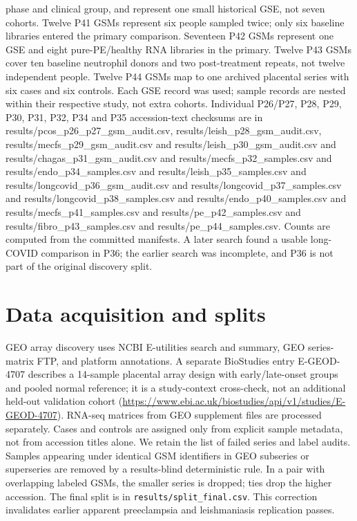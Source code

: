 \documentclass[11pt,a4paper]{article}
\begin{document}
phase and clinical group, and represent one small historical GSE, not seven cohorts. Twelve P41 GSMs represent six people sampled twice; only six baseline libraries entered the primary comparison. Seventeen P42 GSMs represent one GSE and eight pure-PE/healthy RNA libraries in the primary. Twelve P43 GSMs cover ten baseline neutrophil donors and two post-treatment repeats, not twelve independent people. Twelve P44 GSMs map to one archived placental series with six cases and six controls. Each GSE record was used; sample records are nested within their respective study, not extra cohorts. Individual P26/P27, P28, P29, P30, P31, P32, P34 and P35 accession-text checksums are in results/pcos\_p26\_p27\_gsm\_audit.csv, results/leish\_p28\_gsm\_audit.csv, results/mecfs\_p29\_gsm\_audit.csv and results/leish\_p30\_gsm\_audit.csv and results/chagas\_p31\_gsm\_audit.csv and results/mecfs\_p32\_samples.csv and results/endo\_p34\_samples.csv and results/leish\_p35\_samples.csv and results/longcovid\_p36\_gsm\_audit.csv and results/longcovid\_p37\_samples.csv and results/longcovid\_p38\_samples.csv and results/endo\_p40\_samples.csv and results/mecfs\_p41\_samples.csv and results/pe\_p42\_samples.csv and results/fibro\_p43\_samples.csv and results/pe\_p44\_samples.csv. Counts are computed from the committed manifests. A later search found a usable long-COVID comparison in P36; the earlier search was incomplete, and P36 is not part of the original discovery split.
\section{Data acquisition and splits}
GEO array discovery uses NCBI E-utilities search and summary, GEO series-matrix FTP, and platform annotations. A separate BioStudies entry E-GEOD-4707 describes a 14-sample placental array design with early/late-onset groups and pooled normal reference; it is a study-context cross-check, not an additional held-out validation cohort (\url{https://www.ebi.ac.uk/biostudies/api/v1/studies/E-GEOD-4707}). RNA-seq matrices from GEO supplement files are processed separately. Cases and controls are assigned only from explicit sample metadata, not from accession titles alone. We retain the list of failed series and label audits. Samples appearing under identical GSM identifiers in GEO subseries or superseries are removed by a results-blind deterministic rule. In a pair with overlapping labeled GSMs, the smaller series is dropped; ties drop the higher accession. The final split is in \texttt{results/split\_final.csv}. This correction invalidates earlier apparent preeclampsia and leishmaniasis replication passes.
\end{document}

